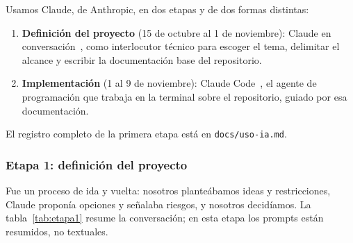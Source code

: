 \documentclass[11pt,a4paper]{article}
\newcommand{\code}[1]{\texttt{#1}}
\begin{document}
Usamos Claude, de Anthropic, en dos etapas y de dos formas distintas:
\begin{enumerate}
  \item \textbf{Definición del proyecto} (15 de octubre al 1 de noviembre): Claude en conversación~\cite{claude}, como interlocutor técnico para escoger el tema, delimitar el alcance y escribir la documentación base del repositorio.
  \item \textbf{Implementación} (1 al 9 de noviembre): Claude Code~\cite{claudecode}, el agente de programación que trabaja en la terminal sobre el repositorio, guiado por esa documentación.
\end{enumerate}
El registro completo de la primera etapa está en \code{docs/uso-ia.md}.

\subsubsection{Etapa 1: definición del proyecto}

Fue un proceso de ida y vuelta: nosotros planteábamos ideas y restricciones, Claude proponía opciones y señalaba riesgos, y nosotros decidíamos. La tabla~\ref{tab:etapa1} resume la conversación; en esta etapa los prompts están resumidos, no textuales.
\end{document}
